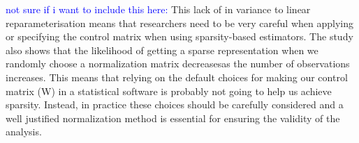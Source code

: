 \textcolor{blue}{not sure if i want to include this here:}
This lack of in variance to linear reparameterisation means that researchers need to be very careful when applying or specifying the control matrix when using sparsity-based estimators. The study also shows that the likelihood of getting a sparse representation when we randomly choose a normalization matrix decreasesas the number of observations increases. This means that relying on the default choices for making our control matrix (W) in a statistical software is probably not going to help us achieve sparsity. Instead, in practice these choices should be carefully considered and a well justified normalization method is essential for ensuring the validity of the analysis. 